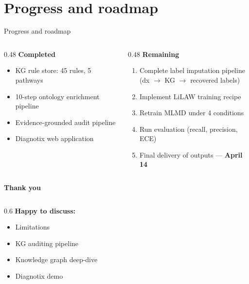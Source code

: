 \documentclass[aspectratio=169]{beamer}
\begin{document}
\section{Progress and roadmap}

\begin{frame}{Progress and roadmap}
  \begin{columns}[T]
    \begin{column}{0.48\textwidth}
      \textbf{Completed}
      \begin{itemize}
        \item[\faCheckSquare] KG rule store: 45 rules, 5 pathways
        \item[\faCheckSquare] 10-step ontology enrichment pipeline
        \item[\faCheckSquare] Evidence-grounded audit pipeline
        \item[\faCheckSquare] Diagnotix web application
      \end{itemize}
    \end{column}
    \begin{column}{0.48\textwidth}
      \textbf{Remaining}
      \begin{enumerate}
        \item Complete label imputation pipeline\\
              {\small (dx $\to$ KG $\to$ recovered labels)}
        \item Implement LiLAW training recipe
        \item Retrain MLMD under 4 conditions
        \item Run evaluation (recall, precision, ECE)
        \item Final delivery of outputs --- \textbf{April 14}
      \end{enumerate}
    \end{column}
  \end{columns}
\end{frame}


\begin{frame}{}
  \centering
  \vspace{2em}
  {\Large\textbf{Thank you}}

  \vspace{1.5em}
  \begin{columns}[c]
    \begin{column}{0.6\textwidth}
      \small
      \textbf{Happy to discuss:}
      \begin{itemize}
        \item Limitations
        \item KG auditing pipeline
        \item Knowledge graph deep-dive
        \item Diagnotix demo
      \end{itemize}
    \end{column}
  \end{columns}
\end{frame}
\end{document}
